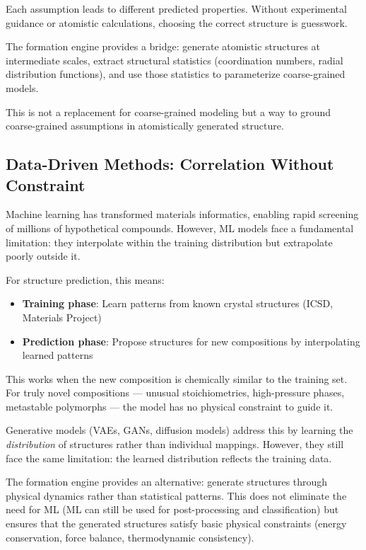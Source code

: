 \documentclass[11pt]{article}
\begin{document}
Each assumption leads to different predicted properties. Without experimental guidance or atomistic calculations, choosing the correct structure is guesswork.

The formation engine provides a bridge: generate atomistic structures at intermediate scales, extract structural statistics (coordination numbers, radial distribution functions), and use those statistics to parameterize coarse-grained models.

This is not a replacement for coarse-grained modeling but a way to ground coarse-grained assumptions in atomistically generated structure.

\subsection{Data-Driven Methods: Correlation Without Constraint}

Machine learning has transformed materials informatics, enabling rapid screening of millions of hypothetical compounds. However, ML models face a fundamental limitation: they interpolate within the training distribution but extrapolate poorly outside it.

For structure prediction, this means:

\begin{itemize}
\item \textbf{Training phase}: Learn patterns from known crystal structures (ICSD, Materials Project)
\item \textbf{Prediction phase}: Propose structures for new compositions by interpolating learned patterns
\end{itemize}

This works when the new composition is chemically similar to the training set. For truly novel compositions — unusual stoichiometries, high-pressure phases, metastable polymorphs — the model has no physical constraint to guide it.

Generative models (VAEs, GANs, diffusion models) address this by learning the \textit{distribution} of structures rather than individual mappings. However, they still face the same limitation: the learned distribution reflects the training data.

The formation engine provides an alternative: generate structures through physical dynamics rather than statistical patterns. This does not eliminate the need for ML (ML can still be used for post-processing and classification) but ensures that the generated structures satisfy basic physical constraints (energy conservation, force balance, thermodynamic consistency).
\end{document}
